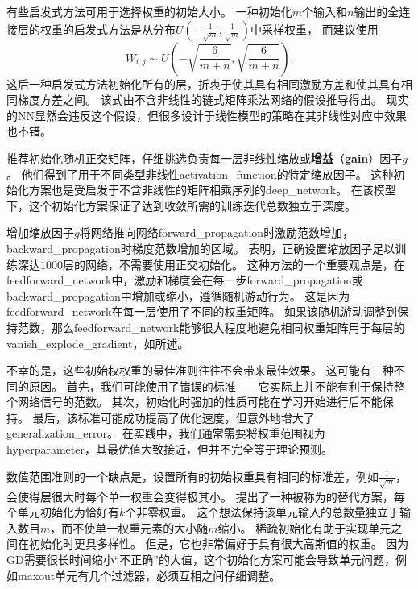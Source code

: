 有些启发式方法可用于选择权重的初始大小。
一种初始化$m$个输入和$n$输出的全连接层的权重的启发式方法是从分布$U(-\frac{1}{\sqrt{m}}, \frac{1}{\sqrt{m}})$中采样权重，
而\cite{Glorot+al-AI-2011-small}建议使用
\begin{equation}
    W_{i,j} \sim U \left(-\sqrt{\frac{6}{m+n}}, \sqrt{\frac{6}{m+n}}\right) .
\end{equation}
这后一种启发式方法初始化所有的层，折衷于使其具有相同激励方差和使其具有相同梯度方差之间。
该式由不含非线性的链式矩阵乘法网络的假设推导得出。
现实的\gls{NN}显然会违反这个假设，但很多设计于线性模型的策略在其非线性对应中效果也不错。


\cite{Saxe-et-al-ICLR13}推荐初始化随机正交矩阵，仔细挑选负责每一层非线性缩放或\textbf{增益}（\textbf{gain}）因子$g$。
他们得到了用于不同类型非线性\gls{activation_function}的特定缩放因子。
这种初始化方案也是受启发于不含非线性的矩阵相乘序列的\gls{deep_network}。
在该模型下，这个初始化方案保证了达到收敛所需的训练迭代总数独立于深度。


增加缩放因子$g$将网络推向网络\gls{forward_propagation}时激励范数增加，\gls{backward_propagation}时梯度范数增加的区域。
\cite{Sussillo14}表明，正确设置缩放因子足以训练深达$1000$层的网络，不需要使用正交初始化。
这种方法的一个重要观点是，在\gls{feedforward_network}中，激励和梯度会在每一步\gls{forward_propagation}或\gls{backward_propagation}中增加或缩小，遵循随机游动行为。
这是因为\gls{feedforward_network}在每一层使用了不同的权重矩阵。
如果该随机游动调整到保持范数，那么\gls{feedforward_network}能够很大程度地避免相同权重矩阵用于每层的\gls{vanish_explode_gradient}，如所述。


不幸的是，这些初始权权重的最佳准则往往不会带来最佳效果。
这可能有三种不同的原因。
首先，我们可能使用了错误的标准——它实际上并不能有利于保持整个网络信号的范数。
其次，初始化时强加的性质可能在学习开始进行后不能保持。
最后，该标准可能成功提高了优化速度，但意外地增大了\gls{generalization_error}。
在实践中，我们通常需要将权重范围视为\gls{hyperparameter}，其最优值大致接近，但并不完全等于理论预测。


数值范围准则的一个缺点是，设置所有的初始权重具有相同的标准差，例如$\frac{1}{\sqrt{m}}$，会使得层很大时每个单一权重会变得极其小。
\cite{martens2010hessian-small}提出了一种被称为的替代方案，每个单元初始化为恰好有$k$个非零权重。
这个想法保持该单元输入的总数量独立于输入数目$m$，而不使单一权重元素的大小随$m$缩小。
稀疏初始化有助于实现单元之间在初始化时更具多样性。
但是，它也非常偏好于具有很大高斯值的权重。
因为\gls{GD}需要很长时间缩小``不正确''的大值，这个初始化方案可能会导致单元问题，例如\gls{maxout}单元有几个过滤器，必须互相之间仔细调整。


